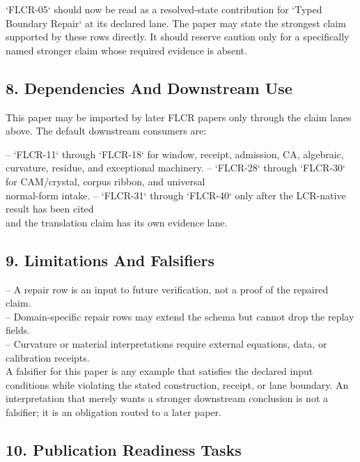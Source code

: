 \documentclass[11pt]{article}
\begin{document}
`FLCR-05` should now be read as a resolved-state contribution for `Typed Boundary Repair` at its declared lane. The paper may state the strongest claim supported by these rows directly. It should reserve caution only for a specifically named stronger claim whose required evidence is absent.

\subsection*{8. Dependencies And Downstream Use}

This paper may be imported by later FLCR papers only through the claim lanes
above. The default downstream consumers are:

\noindent{}-- `FLCR-11` through `FLCR-18` for window, receipt, admission, CA, algebraic,\\
  curvature, residue, and exceptional machinery.
\noindent{}-- `FLCR-28` through `FLCR-30` for CAM/crystal, corpus ribbon, and universal\\
  normal-form intake.
\noindent{}-- `FLCR-31` through `FLCR-40` only after the LCR-native result has been cited\\
  and the translation claim has its own evidence lane.

\subsection*{9. Limitations And Falsifiers}

\noindent{}-- A repair row is an input to future verification, not a proof of the repaired claim.\\
\noindent{}-- Domain-specific repair rows may extend the schema but cannot drop the replay fields.\\
\noindent{}-- Curvature or material interpretations require external equations, data, or calibration receipts.\\

A falsifier for this paper is any example that satisfies the declared input
conditions while violating the stated construction, receipt, or lane boundary.
An interpretation that merely wants a stronger downstream conclusion is not a
falsifier; it is an obligation routed to a later paper.

\subsection*{10. Publication Readiness Tasks}
\end{document}
